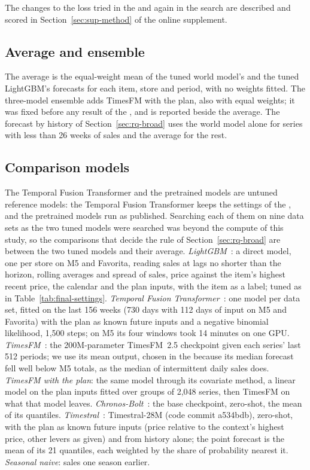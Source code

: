 \ifjournal
The changes to the loss tried in the \firstver{} and again in the search are
described and scored in Section~\ref{sec:sup-method} of the online supplement.

\else

\fi

\subsection{Average and ensemble}
The average is the equal-weight mean of the tuned world model's and the tuned
LightGBM's forecasts for each item, store and period, with no weights fitted.
The three-model ensemble adds TimesFM with the plan, also with equal weights; it
was fixed before any result of the \revn{}, and is reported
beside the average. The forecast by history of Section~\ref{sec:rq-broad} uses
the world model alone for series with less than 26 weeks of sales and the
average for the rest.

\subsection{Comparison models}
The Temporal Fusion Transformer and the pretrained models are untuned reference
models: the Temporal Fusion Transformer keeps the settings of the \firstver{},
and the pretrained models run as published. Searching each of them on nine data
sets as the two tuned models were searched was beyond the compute of this study,
so the comparisons that decide the rule of Section~\ref{sec:rq-broad} are
between the two tuned models and their average.
\emph{LightGBM}~\cite{lightgbm}: a direct model, one per store on M5 and
Favorita, reading sales at lags no shorter than the horizon, rolling averages and
spread of sales, price against the item's highest recent price, the calendar and
the plan inputs, with the item as a label; tuned as in Table~\ref{tab:final-settings}.
\emph{Temporal Fusion Transformer}~\cite{tft}: one model per data set,
fitted on the last 156 weeks (730 days with 112 days of input on M5 and
Favorita) with the plan as known future inputs and a negative binomial
likelihood, 1,500 steps; on M5 its four windows took 14 minutes on one GPU. \emph{TimesFM}~\cite{timesfm,timesfm25}:
the 200M-parameter TimesFM~2.5 checkpoint given each series' last 512 periods;
we use its mean output, chosen in the \firstver{} because its median forecast
fell well below M5 totals, as the median of intermittent daily sales does. \emph{TimesFM with the plan}: the same model
through its covariate method, a linear model on the plan inputs fitted over
groups of 2,048 series, then TimesFM on what that model leaves.
\emph{Chronos-Bolt}~\cite{chronos}: the base checkpoint, zero-shot, the mean of
its quantiles. \emph{Timestral}~\cite{timestral}: Timestral-28M (code commit
a534bdb), zero-shot, with the plan as known future inputs (price relative to
the context's highest price, other levers as given) and from history alone;
the point forecast is the mean of its 21 quantiles, each weighted by the share
of probability nearest it. \emph{Seasonal naive}: sales one season earlier.


